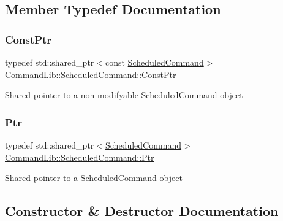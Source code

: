 \subsection{Member Typedef Documentation}
\mbox{\label{class_command_lib_1_1_scheduled_command_a67af8cec078bd99c942eb30c60a59a33}} 
\subsubsection{\texorpdfstring{Const\+Ptr}{ConstPtr}}
{\footnotesize\ttfamily typedef std\+::shared\+\_\+ptr$<$const \mbox{\hyperlink{class_command_lib_1_1_scheduled_command}{Scheduled\+Command}}$>$ \mbox{\hyperlink{class_command_lib_1_1_scheduled_command_a67af8cec078bd99c942eb30c60a59a33}{Command\+Lib\+::\+Scheduled\+Command\+::\+Const\+Ptr}}}



Shared pointer to a non-\/modifyable \mbox{\hyperlink{class_command_lib_1_1_scheduled_command}{Scheduled\+Command}} object

\mbox{\label{class_command_lib_1_1_scheduled_command_ae5efd86637fd8da3ce36b11bc007836d}} 
\subsubsection{\texorpdfstring{Ptr}{Ptr}}
{\footnotesize\ttfamily typedef std\+::shared\+\_\+ptr$<$\mbox{\hyperlink{class_command_lib_1_1_scheduled_command}{Scheduled\+Command}}$>$ \mbox{\hyperlink{class_command_lib_1_1_scheduled_command_ae5efd86637fd8da3ce36b11bc007836d}{Command\+Lib\+::\+Scheduled\+Command\+::\+Ptr}}}



Shared pointer to a \mbox{\hyperlink{class_command_lib_1_1_scheduled_command}{Scheduled\+Command}} object



\subsection{Constructor \& Destructor Documentation}
\mbox{\label{class_command_lib_1_1_scheduled_command_a4f22a429c29a9e28f547f1f9f2578f93}} 
